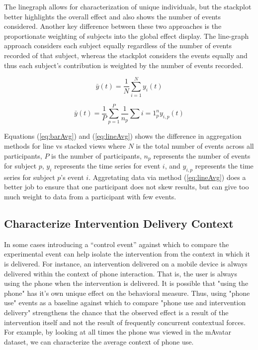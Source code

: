 The linegraph allows for characterization of unique individuals, but the stackplot better highlights the overall effect and also shows the number of events considered.
Another key difference between these two approaches is the proportionate weighting of subjects into the global effect display.
The line-graph approach considers each subject equally regardless of the number of events recorded of that subject, whereas the stackplot considers the events equally and thus each subject's contribution is weighted by the number of events recorded.

\begin{equation}
	\bar{y}(t) = \frac{1}{N} \sum\limits_{i=1}^N y_i(t)
	\label{eq:barAvg}
\end{equation}

\begin{equation}
	\bar{y}(t) = \frac{1}{P} \sum\limits_{p=1}^P \frac{1}{n_p} \sum\limits{i=1}^n_p y_{i,p}(t)
	\label{eq:lineAvg}
\end{equation}
	
Equations (\ref{eq:barAvg}) and (\ref{eq:lineAvg}) shows the difference in aggregation methods for line vs stacked views where $N$ is the total number of events across all participants, $P$ is the number of participants, $n_p$ represents the number of events for subject $p$,  $y_i$ represents the time series for event $i$, and $y_{i,p}$ represents the time series for subject $p$'s event $i$.
Aggretating data via method (\ref{eq:lineAvg}) does a better job to ensure that one participant does not skew results, but can give too much weight to data from a participant with few events.

\subsection{Characterize Intervention Delivery Context}
In some cases introducing a “control event” against which to compare the experimental event can help isolate the intervention from the context in which it is delivered.
For instance, an intervention delivered on a mobile device is always delivered within the context of phone interaction.
That is, the user is always using the phone when the intervention is delivered.
It is possible that "using the phone" has it's own unique effect on the behavioral measure.
Thus, using "phone use" events as a baseline against which to compare "phone use and intervention delivery" strengthens the chance that the observed effect is a result of the intervention itself and not the result of frequently concurrent contextual forces. 
For example, by looking at all times the phone was viewed in the mAvatar dataset, we can characterize the average context of phone use.

